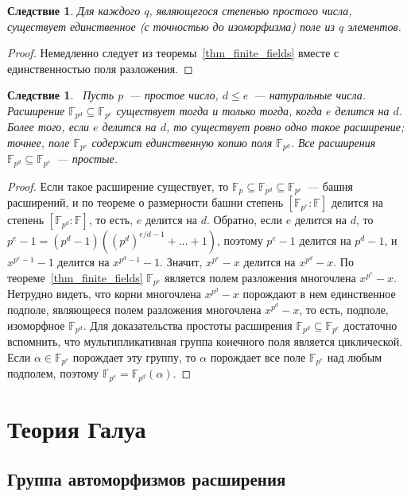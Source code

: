 \documentclass[a4paper,11pt]{scrartcl}
\theoremstyle{plain}
\newtheorem{corollary}[theorem]{Следствие}
\theoremstyle{definition}
\newcommand\mb{\mathbb}
\newcommand\sseq{\subseteq}
\begin{document}
\begin{corollary}
Для каждого $q$, являющегося степенью простого числа, существует
единственное (с точностью до изоморфизма) поле из $q$ элементов.
\end{corollary}
\begin{proof}
Немедленно следует из теоремы~\ref{thm_finite_fields} вместе с
единственностью поля разложения.
\end{proof}

\begin{corollary}~\label{corollary_finite_simple}
Пусть $p$~--- простое число, $d\leq e$~--- натуральные
числа. Расширение $\mb F_{p^d}\sseq \mb F_{p^e}$ существует тогда и
только тогда, когда $e$ делится на $d$. Более того, если $e$ делится
на $d$, то существует ровно одно такое расширение; точнее, поле $\mb
F_{p^e}$ содержит единственную копию поля $\mb F_{p^d}$. Все
расширения $\mb F_{p^d}\sseq\mb F_{p^e}$~--- простые. 
\end{corollary}
\begin{proof}
Если такое расширение существует, то $\mb F_p\sseq \mb F_{p^d}\sseq\mb
F_{p^e}$~--- башня расширений, и по теореме о размерности башни
степень $[\mb F_{p^e}:\mb F]$ делится на степень $[\mb F_{p^d}:\mb
F]$, то есть, $e$ делится на $d$. Обратно, если $e$ делится на $d$, то
$p^e-1=(p^d-1)((p^d)^{e/d-1}+\dots+1)$, поэтому $p^e-1$ делится на
$p^d-1$, и $x^{p^e-1}-1$ делится на $x^{p^d-1}-1$. Значит,
$x^{p^e}-x$ делится на $x^{p^d}-x$. По теореме~\ref{thm_finite_fields}
$\mb F_{p^e}$ является полем разложения многочлена
$x^{p^e}-x$. Нетрудно видеть, что корни многочлена $x^{p^d}-x$
порождают в нем единственное подполе, являющееся полем разложения
многочлена $x^{p^d}-x$, то есть, подполе, изоморфное $\mb F_{p^d}$.
Для доказательства простоты расширения $\mb F_{p^d}\sseq\mb F_{p^e}$
достаточно вспомнить, что мультипликативная группа конечного поля
является циклической.
Если $\alpha\in\mb F_{p^e}$ порождает эту группу, то $\alpha$
порождает все
поле $\mb F_{p^e}$ над любым подполем, поэтому $\mb F_{p^e}=\mb
F_{p^d}(\alpha)$.
\end{proof}

\section{Теория Галуа}

\subsection{Группа автоморфизмов расширения}
\end{document}

